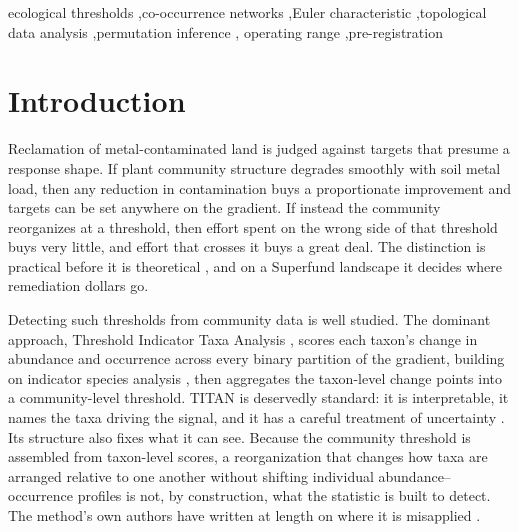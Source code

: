 \documentclass[review,12pt,authoryear]{elsarticle}
\theoremstyle{remark}
\begin{document}
\begin{frontmatter}
\begin{keyword}
ecological thresholds \sep co-occurrence networks \sep Euler characteristic
\sep topological data analysis \sep permutation inference \sep
operating range \sep pre-registration
\end{keyword}

\end{frontmatter}

\section{Introduction}
\label{sec:intro}

Reclamation of metal-contaminated land is judged against targets that presume a
response shape. If plant community structure degrades smoothly with soil metal
load, then any reduction in contamination buys a proportionate improvement and
targets can be set anywhere on the gradient. If instead the community reorganizes
at a threshold, then effort spent on the wrong side of that threshold buys very
little, and effort that crosses it buys a great deal. The distinction is
practical before it is theoretical
\citep{groffman2006thresholds}, and on a Superfund landscape it decides where
remediation dollars go.

Detecting such thresholds from community data is well studied. The dominant
approach, Threshold Indicator Taxa Analysis \citep[TITAN;][]{baker2010titan},
scores each taxon's change in abundance and occurrence across every binary
partition of the gradient, building on indicator species analysis
\citep{dufrene1997indval}, then aggregates the taxon-level change points into a
community-level threshold. TITAN is deservedly standard: it is interpretable,
it names the taxa driving the signal, and it has a careful treatment of
uncertainty \citep{king2010titan2}. Its structure also fixes what it can see.
Because the community threshold is assembled from taxon-level scores, a
reorganization that changes how taxa are arranged relative to one another
without shifting individual abundance--occurrence profiles is not, by
construction, what the statistic is built to detect. The method's own authors
have written at length on where it is misapplied \citep{baker2013limits}.
\end{document}

